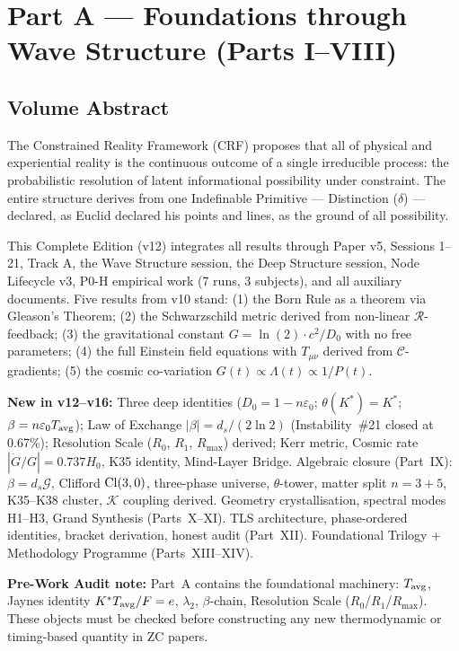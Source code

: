 \documentclass[11pt, a4paper]{article}
\begin{document}
\newpage

\section{Part A --- Foundations through Wave Structure (Parts I--VIII)}

\subsection*{Volume Abstract}

\begin{volumebox}[title={Part A --- CRF Complete Edition v17.5 (Parts I--VIII)}]
\sloppy
The Constrained Reality Framework (CRF) proposes that all of physical and experiential
reality is the continuous outcome of a single irreducible process: the probabilistic resolution
of latent informational possibility under constraint. The entire structure derives from one
Indefinable Primitive --- Distinction ($\delta$) --- declared, as Euclid declared his points
and lines, as the ground of all possibility.

This Complete Edition (v12) integrates all results through Paper v5, Sessions 1--21,
Track A, the Wave Structure session, the Deep Structure session, Node Lifecycle v3,
P0-H empirical work (7 runs, 3 subjects), and all auxiliary documents. Five results from v10 stand: (1) the Born Rule as a
theorem via Gleason's Theorem; (2) the Schwarzschild metric derived from non-linear
$\mathcal{R}$-feedback; (3) the gravitational constant $G = \ln(2)\cdot c^2/D_0$ with no
free parameters; (4) the full Einstein field equations with $T_{\mu\nu}$ derived from
$\mathcal{C}$-gradients; (5) the cosmic co-variation $G(t)\propto\Lambda(t)\propto 1/P(t)$.

\textbf{New in v12--v16:} Three deep identities ($D_0 = 1-n\varepsilon_0$;
$\theta(K^*)=K^*$; $\beta = n\varepsilon_0 T_{\rm avg}$); Law of Exchange
$|\beta| = d_s/(2\ln 2)$ (Instability~\#21 closed at 0.67\%); Resolution Scale
($R_0$, $R_1$, $R_{\max}$) derived; Kerr metric, Cosmic rate
$|\dot{G}/G| = 0.737 H_0$, K35 identity, Mind-Layer Bridge.
Algebraic closure (Part~IX): $\beta = d_s\mathcal{G}$, Clifford ${\rm Cl}(3,0)$,
three-phase universe, $\theta$-tower, matter split $n=3+5$, K35--K38 cluster,
$\mathcal{K}$ coupling derived.
Geometry crystallisation, spectral modes H1--H3, Grand Synthesis (Parts~X--XI).
TLS architecture, phase-ordered identities, bracket derivation, honest audit (Part~XII).
Foundational Trilogy + Methodology Programme (Parts~XIII--XIV).

\textbf{Pre-Work Audit note:} Part~A contains the foundational
machinery: $T_{\rm avg}$, Jaynes identity $K^*T_{\rm avg}/F = e$,
$\lambda_2$, $\beta$-chain, Resolution Scale ($R_0$/$R_1$/$R_{\max}$).
These objects must be checked before constructing any new thermodynamic
or timing-based quantity in ZC papers.
\end{volumebox}
\end{document}
